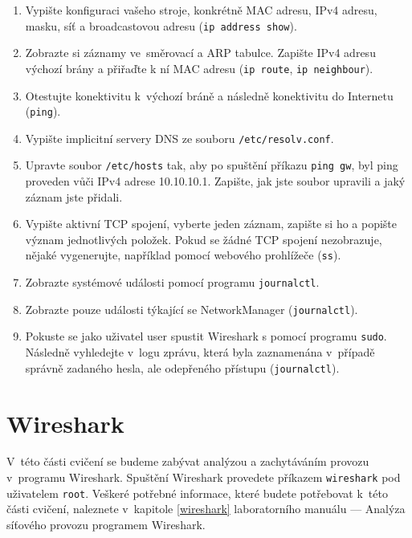\begin{enumerate}
\item Vypište konfiguraci vašeho stroje, konkrétně MAC adresu, IPv4 adresu, masku, síť a broadcastovou adresu ({\tt ip address show}).
\item Zobrazte si záznamy ve~směrovací a ARP tabulce. Zapište IPv4 adresu
  výchozí brány a přiřaďte k ní MAC adresu ({\tt ip route}, {\tt ip neighbour}).
\item Otestujte konektivitu k~výchozí bráně a následně konektivitu do Internetu ({\tt ping}).
\item Vypište implicitní servery DNS ze souboru {\tt /etc/resolv.conf}.
\item Upravte soubor {\tt /etc/hosts} tak, aby po spuštění příkazu \texttt{ping gw}, byl ping proveden vůči IPv4 adrese 10.10.10.1. Zapište, jak jste soubor upravili a jaký záznam jste přidali.
\item Vypište aktivní TCP spojení, vyberte jeden záznam, zapište si ho a popište
  význam jednotlivých položek. Pokud se žádné TCP spojení nezobrazuje, nějaké
    vygenerujte, například pomocí webového prohlížeče ({\tt ss}).
\item Zobrazte systémové události pomocí programu \texttt{journalctl}.
\item Zobrazte pouze události týkající se NetworkManager (\texttt{journalctl}).
\item Pokuste se jako uživatel user spustit Wireshark s pomocí programu \texttt{sudo}. Následně vyhledejte v~logu zprávu, která byla zaznamenána v~případě správně zadaného hesla, ale odepřeného přístupu (\texttt{journalctl}).

\end{enumerate}

\section{Wireshark}
V~této části cvičení se budeme zabývat analýzou a zachytáváním provozu
v~programu Wireshark. Spuštění Wireshark provedete příkazem \texttt{wireshark}
pod uživatelem \texttt{root}. Veškeré potřebné informace, které budete
potřebovat k~této části cvičení, naleznete v~kapitole \ref{wireshark} laboratorního manuálu
--- Analýza síťového provozu programem Wireshark.

